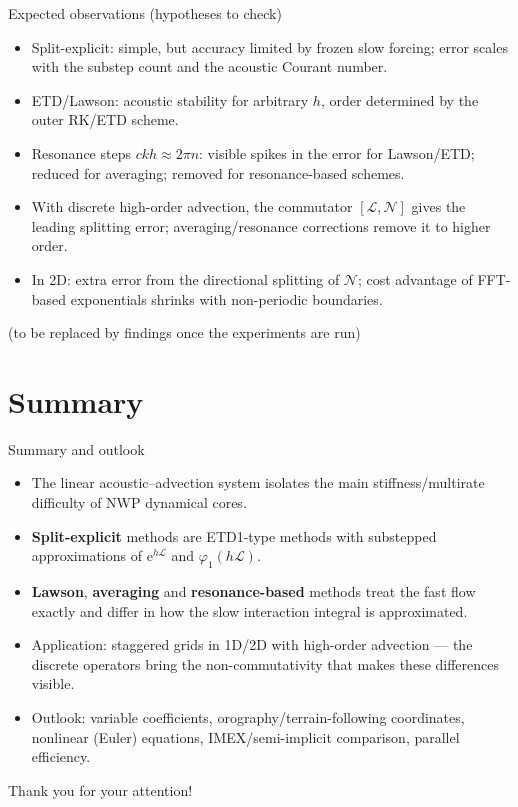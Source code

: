 \documentclass[aspectratio=169,10pt]{beamer}
\newcommand{\ee}{\mathrm{e}}
\newcommand{\LL}{\mathcal{L}}   %
\newcommand{\NN}{\mathcal{N}}   %
\newcommand{\ph}{\varphi}
\begin{document}
	\begin{frame}{Expected observations (hypotheses to check)}
		\begin{itemize}
			\item Split-explicit: simple, but accuracy limited by frozen slow forcing; error scales with the substep count and the
			acoustic Courant number.
			\item ETD/Lawson: acoustic stability for arbitrary $h$, order determined by the outer RK/ETD scheme.
			\item Resonance steps $ckh\approx 2\pi n$: visible spikes in the error for Lawson/ETD; reduced for averaging;
			removed for resonance-based schemes.
			\item With discrete high-order advection, the commutator $[\LL,\NN]$ gives the leading splitting error;
			averaging/resonance corrections remove it to higher order.
			\item In 2D: extra error from the directional splitting of $\NN$; cost advantage of FFT-based exponentials shrinks with non-periodic boundaries.
		\end{itemize}
		\vspace{0.5em}
		{\footnotesize (to be replaced by findings once the experiments are run)}
	\end{frame}
	
	\section{Summary}
	
	\begin{frame}{Summary and outlook}
		\begin{itemize}
			\item The linear acoustic--advection system isolates the main stiffness/multirate difficulty of NWP dynamical cores.
			\item \textbf{Split-explicit} methods are ETD1-type methods with substepped approximations of $\ee^{h\LL}$ and $\ph_1(h\LL)$.
			\item \textbf{Lawson}, \textbf{averaging} and \textbf{resonance-based} methods treat the fast flow exactly and differ in how the
			slow interaction integral is approximated.
			\item Application: staggered grids in 1D/2D with high-order advection --- the discrete operators bring the
			non-commutativity that makes these differences visible.
			\item Outlook: variable coefficients, orography/terrain-following coordinates, nonlinear (Euler) equations,
			IMEX/semi-implicit comparison, parallel efficiency.
		\end{itemize}
		\vspace{1em}
		\centering\Large Thank you for your attention!
	\end{frame}
	
\end{document}

